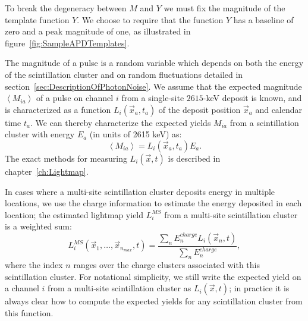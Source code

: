 To break the degeneracy between $M$ and $Y$ we must fix the magnitude of the template function $Y$.  We choose to require that the function $Y$ has a baseline of zero and a peak magnitude of one, as illustrated in figure~\ref{fig:SampleAPDTemplates}.

The magnitude of a pulse is a random variable which depends on both the energy of the scintillation cluster and on random fluctuations detailed in section~\ref{sec:DescriptionOfPhotonNoise}.  We assume that the expected magnitude $\left<M_{ia}\right>$ of a pulse on channel $i$ from a single-site $2615$-keV deposit is known, and is characterized as a function $L_i(\vec{x}_a, t_a)$ of the deposit position $\vec{x}_a$ and calendar time $t_a$.  We can thereby characterize the expected yields $M_{ia}$ from a scintillation cluster with energy $E_a$ (in units of 2615 keV) as:
\begin{equation}\label{eqn:DefineLByEandM}
\left< M_{ia} \right> = L_i(\vec{x}_a, t_a) E_a.
\end{equation}
The exact methods for measuring $L_i(\vec{x}, t)$ is described in chapter~\ref{ch:Lightmap}.

In cases where a multi-site scintillation cluster deposits energy in multiple locations, we use the charge information to estimate the energy deposited in each location; the estimated lightmap yield $L_i^{MS}$ from a multi-site scintillation cluster is a weighted sum:
\begin{equation}\label{eqn:LightMapMultisite}
L_i^{MS}(\vec{x}_1, \dots, \vec{x}_{n_{max}}, t) = \frac{\sum_n E_n^{charge} L_i(\vec{x}_n, t)}{\sum_n E_n^{charge}},
\end{equation}
where the index $n$ ranges over the charge clusters associated with this scintillation cluster.  For notational simplicity, we still write the expected yield on a channel $i$ from a multi-site scintillation cluster as $L_i(\vec{x}, t)$; in practice it is always clear how to compute the expected yields for any scintillation cluster from this function.

